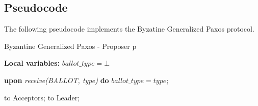 \subsection{Pseudocode}
The following pseudocode implements the Byzatine Generalized Paxos protocol.%

\begin{algorithm} 
	\caption{Byzantine Generalized Paxos - Proposer p}
	\label{BFT-Prop}
	\textbf{Local variables:} $ballot\_type = \bot$
	\begin{algorithmic}[1]
			
		\State \textbf{upon} \textit{receive(BALLOT, type)} \textbf{do} 
		\State \hspace{\algorithmicindent} $ballot\_type = type$;
		\State
		
		\State {} to Acceptors;
		\Else
		\State {} to Leader;
		\EndIf
		\EndFunction
		
	\end{algorithmic}
\end{algorithm}

